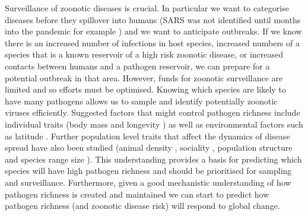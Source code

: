 
Surveillance of zoonotic diseases is crucial.
In particular we want to categorise diseases before they spillover into humans (SARS was not identified until months into the pandemic for example \cite{drosten2003identification}) and we want to anticipate outbreaks. 
If we know there is an increased number of infections in host species, increased numbers of a species that is a known reservoir of a high risk zoonotic disease, or increased contacts between humans and a pathogen reservoir, we can prepare for a potential outbreak in that area.
However, funds for zoonotic surveillance are limited and so efforts must be optimised.
Knowing which species are likely to have many pathogens allows us to sample and identify potentially zoonotic viruses efficiently.
Suggested factors that might control pathogen richness include individual traits (body mass \cite{kamiya2014determines, arneberg2002host, poulin1995phylogeny} and longevity \cite{nunn2003comparative, ezenwa2006host})
as well as environmental factors such as latitude \cite{poulin2010latitudinal, kamiya2014determines}.
Further population level traits that affect the dynamics of disease spread have also been studied (animal density \cite{kamiya2014determines, nunn2003comparative, arneberg2002host}, sociality \cite{bordes2007rodent, vitone2004body, altizer2003social, ezenwa2006host}, population structure \cite{nunes2006localized, maganga2014bat, gay2014parasite, turmelle2009correlates} and  species range size \cite{kamiya2014determines, nunn2003comparative}).
This understanding provides a basis for predicting which species will have high pathogen richness and should be prioritised for sampling and surveillance.
Furthermore, given a good mechanistic understanding of how pathogen richness is created and maintained we can start to predict how pathogen richness (and zoonotic disease risk) will respond to global change.






